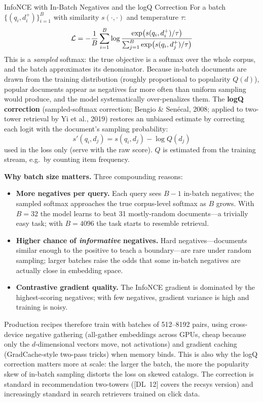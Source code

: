 \begin{mathresult}{InfoNCE with In-Batch Negatives and the logQ Correction}
For a batch $\{(q_i, d_i^+)\}_{i=1}^{B}$ with similarity $s(\cdot,\cdot)$ and temperature $\tau$:
\[
\mathcal{L} = -\frac{1}{B}\sum_{i=1}^{B} \log \frac{\exp\!\big(s(q_i, d_i^+)/\tau\big)}{\sum_{j=1}^{B} \exp\!\big(s(q_i, d_j^+)/\tau\big)}
\]
This is a \textit{sampled} softmax: the true objective is a softmax over the whole corpus, and the batch approximates its denominator. Because in-batch documents are drawn from the training distribution (roughly proportional to popularity $Q(d)$), popular documents appear as negatives far more often than uniform sampling would produce, and the model systematically over-penalizes them. The \textbf{logQ correction} (sampled-softmax correction; Bengio \& Sen\'ecal, 2008; applied to two-tower retrieval by Yi et al., 2019) restores an unbiased estimate by correcting each logit with the document's sampling probability:
\[
s'(q_i, d_j) = s(q_i, d_j) - \log Q(d_j)
\]
used in the loss only (serve with the raw score). $Q$ is estimated from the training stream, e.g.\ by counting item frequency.
\end{mathresult}

\textbf{Why batch size matters.} Three compounding reasons:
\begin{itemize}
    \item \textbf{More negatives per query.} Each query sees $B-1$ in-batch negatives; the sampled softmax approaches the true corpus-level softmax as $B$ grows. With $B = 32$ the model learns to beat 31 mostly-random documents---a trivially easy task; with $B = 4096$ the task starts to resemble retrieval.
    \item \textbf{Higher chance of \textit{informative} negatives.} Hard negatives---documents similar enough to the positive to teach a boundary---are rare under random sampling; larger batches raise the odds that some in-batch negatives are actually close in embedding space.
    \item \textbf{Contrastive gradient quality.} The InfoNCE gradient is dominated by the highest-scoring negatives; with few negatives, gradient variance is high and training is noisy.
\end{itemize}
Production recipes therefore train with batches of 512--8192 pairs, using cross-device negative gathering (all-gather embeddings across GPUs, cheap because only the $d$-dimensional vectors move, not activations) and gradient caching (GradCache-style two-pass tricks) when memory binds. This is also why the logQ correction matters more at scale: the larger the batch, the more the popularity skew of in-batch sampling distorts the loss on skewed catalogs. The correction is standard in recommendation two-towers ([DL~12] covers the recsys version) and increasingly standard in search retrievers trained on click data.

